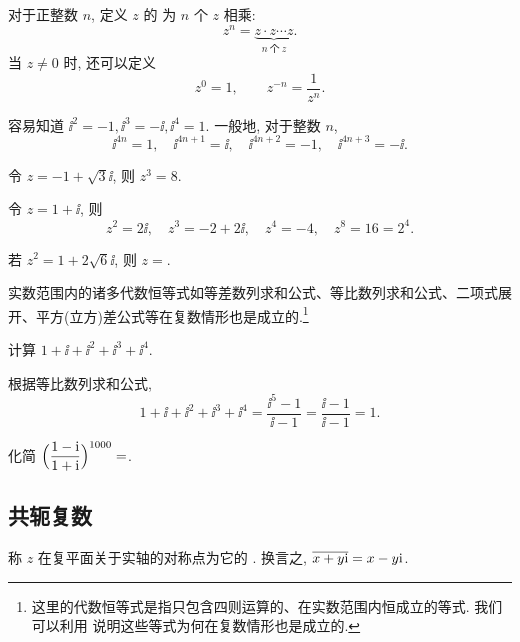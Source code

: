 对于正整数 $n$, 定义 $z$ 的 为 $n$ 个 $z$ 相乘:
\[
  z^n=\underbrace{z\cdot z\cdots z}_{n\ \text{个}\ z}.
\]
当 $z\neq 0$ 时, 还可以定义
\[
  z^0=1,\qquad
  z^{-n}=\frac1{z^n}.
\]

\begin{exampleenum}
  \item 容易知道 $\ii^2=-1,\ii^3=-\ii,\ii^4=1$.
  一般地, 对于整数 $n$, 
  \[
    \ii^{4n}=1,\quad 
    \ii^{4n+1}=\ii,\quad 
    \ii^{4n+2}=-1,\quad 
    \ii^{4n+3}=-\ii.
  \]
  \item 令 $z=-1+\sqrt 3\ii$, 则 $z^3=8$.
  \item 令 $z=1+\ii$, 则
  \[
    z^2=2\ii,\quad 
    z^3=-2+2\ii,\quad 
    z^4=-4,\quad 
    z^8=16=2^4.
  \]
\end{exampleenum}

\begin{exercise}
  若 $z^2=1+2\sqrt6\ii$, 则 $z=$\fillblank[6em]{}.
\end{exercise}

实数范围内的诸多代数恒等式如等差数列求和公式、等比数列求和公式、二项式展开、平方(立方)差公式等在复数情形也是成立的.\footnote{
  这里的代数恒等式是指只包含四则运算的、在实数范围内恒成立的等式.
  我们可以利用 说明这些等式为何在复数情形也是成立的.
}

\begin{example}
  计算 $1+\ii+\ii^2+\ii^3+\ii^4$.
\end{example}

\begin{solution}
  根据等比数列求和公式,
  \[
     1+\ii+\ii^2+\ii^3+\ii^4
    =\frac{\ii^5-1}{\ii-1}
    =\frac{\ii-1}{\ii-1}
    =1.
  \]
\end{solution}

\begin{exercise}
  化简 $\Bigl(\dfrac{1-\mathrm{i}}{1+\mathrm{i}}\Bigr)^{1000}=$\fillblank{}.
\end{exercise}


\subsection{共轭复数}

\begin{definition}
  称 $z$ 在复平面关于实轴的对称点为它的 .
  换言之, $\overline{x+y\mathrm{i}}=x-y\mathrm{i}$.
\end{definition}

